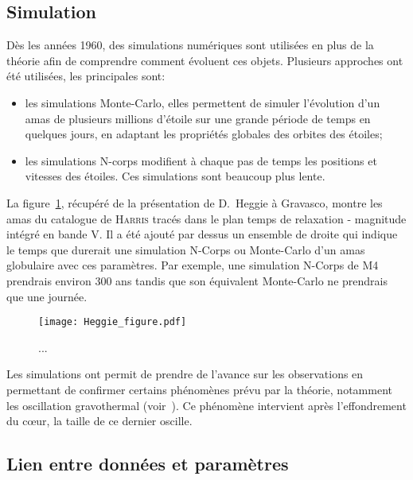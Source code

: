 		\subsection{Simulation}
			Dès les années 1960, des simulations numériques sont utilisées en plus de la
			théorie afin de comprendre comment évoluent ces objets.
			Plusieurs approches ont été utilisées, les principales sont:
			\begin{itemize}
					\item les simulations Monte-Carlo, elles permettent de
						simuler l'évolution d'un amas de plusieurs millions
						d'étoile sur une grande période de temps en quelques
						jours, en adaptant les propriétés globales des
						orbites des étoiles;
					\item les simulations N-corps modifient à chaque pas de
						temps les positions et vitesses des étoiles. Ces simulations sont beaucoup plus lente.
			\end{itemize}
			La figure~\ref{Fig::Intro::HeggieFigure}, récupéré de la présentation de
			D.~Heggie à Gravasco, montre les amas du catalogue de
			\textsc{Harris} tracés dans le plan temps de relaxation - magnitude intégré
			en bande V. Il a été ajouté par dessus un ensemble de droite qui indique le
			temps que durerait une simulation N-Corps ou Monte-Carlo d'un amas
			globulaire avec ces paramètres. Par exemple, une simulation N-Corps de M4
			prendrais environ 300 ans tandis que son équivalent Monte-Carlo ne prendrais
			que une journée.

			\begin{figure}[h]
				\centering \texttt{[image: Heggie\_figure.pdf]}
				\caption{\label{Fig::Intro::HeggieFigure}...}
			\end{figure}

			Les simulations ont permit de prendre de l'avance sur les observations en
			permettant de confirmer certains phénomènes prévu par la théorie, notamment
			les oscillation gravothermal (voir~\cite{1996ApJ...471..796M}). Ce phénomène
			intervient après l'effondrement du cœur, la taille de ce dernier oscille.

		\subsection[Lien]{Lien entre données et paramètres\label{amas}}
